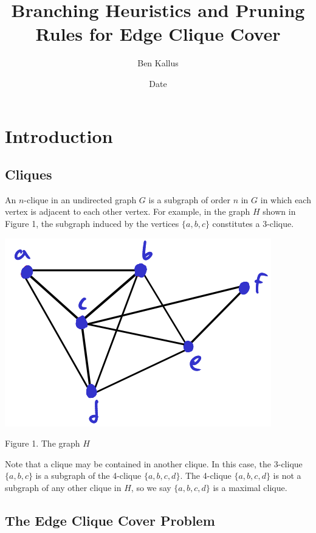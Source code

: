 \documentclass[12pt]{article}
\title{Branching Heuristics and Pruning Rules for Edge Clique Cover}
\author{Ben Kallus}
\date{Date}
\begin{document}
\maketitle

\section*{Introduction}

\subsection*{Cliques}
    An $n$-clique in an undirected graph $G$ is a subgraph of order $n$ in $G$ in which each vertex is adjacent to each other vertex.
    For example, in the graph $H$ shown in Figure 1, the subgraph induced by the vertices $\{a, b, c\}$ constitutes a 3-clique.
    \begin{center}
        \includegraphics[scale=.6]{fig1.png}

        Figure 1. The graph $H$
    \end{center}

    Note that a clique may be contained in another clique.
    In this case, the 3-clique $\{a, b, c\}$ is a subgraph of the 4-clique $\{a, b, c, d\}$.
    The 4-clique $\{a, b, c, d\}$ is not a subgraph of any other clique in $H$, so we say $\{a, b, c, d\}$ is a maximal clique.

\newpage\subsection*{The Edge Clique Cover Problem}
\end{document}
